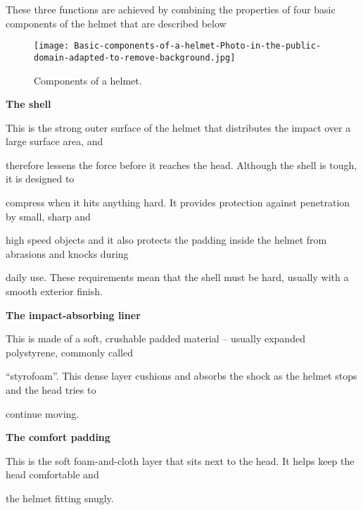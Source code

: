 These three functions are achieved by combining the properties of four basic components of the helmet
that are described below


\begin{figure}[h]
	
	\centering
	
	\texttt{[image: Basic-components-of-a-helmet-Photo-in-the-public-domain-adapted-to-remove-background.jpg]}
	
	\caption{Components of a helmet.}
	
\end{figure}

\textbf{The shell}\vspace{.2cm}



This is the strong outer surface of the helmet that distributes the impact over a large surface area, and

therefore lessens the force before it reaches the head. Although the shell is tough, it is designed to

compress when it hits anything hard. It provides protection against penetration by small, sharp and

high speed objects and it also protects the padding inside the helmet from abrasions and knocks during

daily use. These requirements mean that the shell must be hard, usually with a smooth exterior finish.\vspace{.4cm}



\textbf{The impact-absorbing liner}\vspace{.2cm}



This is made of a soft, crushable padded material – usually expanded polystyrene, commonly called

“styrofoam”. This dense layer cushions and absorbs the shock as the helmet stops and the head tries to

continue moving.\vspace{.4cm}



\textbf{The comfort padding}\vspace{.2cm}



This is the soft foam-and-cloth layer that sits next to the head. It helps keep the head comfortable and

the helmet fitting snugly.\vspace{.4cm}



